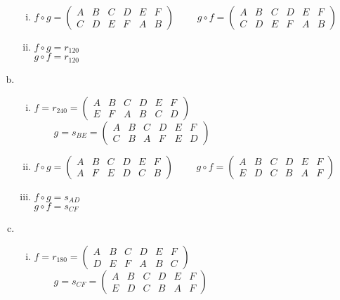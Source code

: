 \begin{enumerate}[(a)]
\begin{enumerate}[(i)]
	\item
	$f\circ g=\begin{pmatrix}
	A & B & C & D & E & F\\
	C & D & E & F & A & B
	\end{pmatrix}$
	$\qquad g\circ f=\begin{pmatrix}
	A & B & C & D & E & F\\
	C & D & E & F & A & B
	\end{pmatrix}$
	
	\item
	$f\circ g = r_{120}$\\
	$g\circ f = r_{120}$
	\end{enumerate}
	
\item
	\begin{enumerate}[(i)]
	\item
	$f=r_{240}=\begin{pmatrix}
	A & B & C & D & E & F\\
	E & F & A & B & C & D
	\end{pmatrix}$
	$\qquad g=s_{BE}=\begin{pmatrix}
	A & B & C & D & E & F\\
	C & B & A & F & E & D
	\end{pmatrix}$\\
	
	\item
	$f\circ g=\begin{pmatrix}
	A & B & C & D & E & F\\
	A & F & E & D & C & B
	\end{pmatrix}$
	$\qquad g\circ f=\begin{pmatrix}
	A & B & C & D & E & F\\
	E & D & C & B & A & F
	\end{pmatrix}$
	
	\item
	$f\circ g = s_{AD}$\\
	$g\circ f = s_{CF}$
	\end{enumerate}
	
\item
	\begin{enumerate}[(i)]
	\item
	$f=r_{180}=\begin{pmatrix}
	A & B & C & D & E & F\\
	D & E & F & A & B & C
	\end{pmatrix}$
	$\qquad g=s_{CF}=\begin{pmatrix}
	A & B & C & D & E & F\\
	E & D & C & B & A & F
	\end{pmatrix}$\\
	

\end{enumerate}
\end{enumerate}
